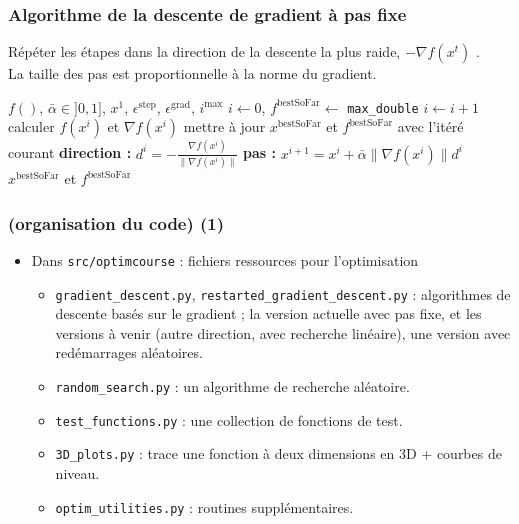 \documentclass[12pt]{beamer}
\begin{document}
\begin{frame}
\frametitle{Algorithme de la descente de gradient à pas fixe} 
\vspace{-0.3cm}
Répéter les étapes dans la direction de la descente la plus raide, $-
\nabla f(x^t)$ \cite{cauchy1847methode,curry1944method}. \\
La taille des pas est proportionnelle à la norme du gradient.
\begin{block}{}
\begin{algorithmic}
\REQUIRE $f()$, $\bar\alpha \in ]0,1]$, $x^1$, $\epsilon^{\text{step}}$, $\epsilon^{\text{grad}}$, $i^{\text{max}}$
\STATE $i \leftarrow 0$, $f^{\text{bestSoFar}} \leftarrow$ \texttt{max\_double}
\REPEAT 
\STATE $i \leftarrow i+1$
\STATE calculer $f(x^i)$ et $\nabla f(x^i)$
\STATE mettre à jour $x^{\text{bestSoFar}}$ et $f^{\text{bestSoFar}}$ avec l’itéré courant
\ENDIF
\STATE \textbf{direction : } $d^i = - \frac{\nabla f(x^i)}{\lVert \nabla f(x^i) \rVert}$
\STATE \textbf{pas : } $x^{i+1} = x^i + \bar\alpha \lVert \nabla f(x^i) \rVert d^i$
\RETURN $x^{\text{bestSoFar}}$ et $f^{\text{bestSoFar}}$
\end{algorithmic}
\end{block}
\end{frame}


\begin{frame}
\frametitle{(organisation du code) (1)} 
\vspace{-0.4cm}
\begin{itemize}
\small
\item Dans \texttt{src/optimcourse} : fichiers ressources pour l’optimisation 
\begin{itemize}
\small
\item \texttt{gradient\_descent.py}, \texttt{restarted\_gradient\_descent.py} : algorithmes de descente basés sur le gradient ; la version actuelle avec pas fixe, et les versions à venir (autre direction, avec recherche linéaire), une version avec redémarrages aléatoires.
\item \texttt{random\_search.py} : un algorithme de recherche aléatoire.
\item \texttt{test\_functions.py} : une collection de fonctions de test.
\item \texttt{3D\_plots.py} : trace une fonction à deux dimensions en 3D + courbes de niveau.
\item \texttt{optim\_utilities.py} : routines supplémentaires.
\end{itemize}
\end{itemize}

\end{frame}
\end{document}
